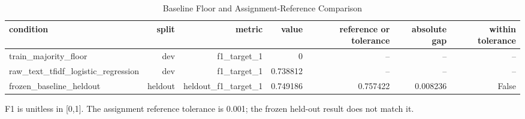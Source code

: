 \begin{table}[t]
\centering
\caption{Baseline Floor and Assignment-Reference Comparison}
\label{tab:baseline_reference}
\begin{adjustbox}{max width=\textwidth}
\scriptsize
\begin{tabular}{lrrrrrr}
\hline
condition & split & metric & value & reference or tolerance & absolute gap & within tolerance \\
\hline
train\_majority\_floor & dev & f1\_target\_1 & 0 & -- & -- & -- \\
raw\_text\_tfidf\_logistic\_regression & dev & f1\_target\_1 & 0.738812 & -- & -- & -- \\
frozen\_baseline\_heldout & heldout & heldout\_f1\_target\_1 & 0.749186 & 0.757422 & 0.008236 & False \\
\hline
\end{tabular}
\end{adjustbox}
\par\footnotesize{F1 is unitless in [0,1]. The assignment reference tolerance is 0.001; the frozen held-out result does not match it.}
\end{table}

